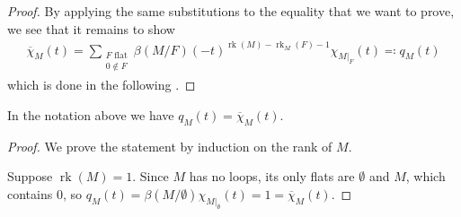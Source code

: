 \documentclass[12pt,a4paper,english]{scrartcl}
\DeclareMathOperator{\rank}{rk}
\begin{document}
\begin{proof}
By applying the same substitutions to the equality that we want to prove, we see that it remains to show \begin{align*}
    \overline{\chi}_M(t)=\sum_{\substack{F \text{ flat} \\ 0\notin F}}\beta(M/F)(-t)^{\rank(M)-\rank_M(F)-1}\chi_{M|_F}(t) \eqcolon q_M(t)
\end{align*}
which is done in the following .
\end{proof}

\begin{lemma}\label{lem: formulaforqM}
In the notation above we have $q_M(t) = \overline{\chi}_M(t)$.
\end{lemma}

\begin{proof}
We prove the statement by induction on the rank of $M$. 

Suppose $\rank(M) = 1$. Since $M$ has no loops, its only flats are $\emptyset$ and $M$, which contains $0$, so $q_M(t) = \beta(M/\emptyset)\chi_{M|_\emptyset}(t) = 1 =  \overline{\chi}_M(t)$.


\end{proof}
\end{document}
